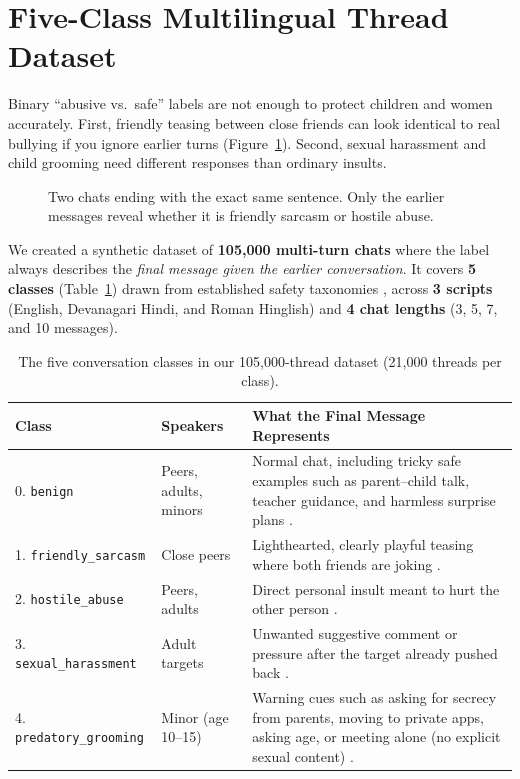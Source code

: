 \documentclass[11pt,a4paper]{article}
\begin{document}
\section{Five-Class Multilingual Thread Dataset}\label{sec:data}

Binary ``abusive vs.\ safe'' labels are not enough to protect children and women accurately. First, friendly teasing between close friends can look identical to real bullying if you ignore earlier turns (Figure~\ref{fig:chats}). Second, sexual harassment and child grooming need different responses than ordinary insults.

\begin{figure}[H]
  \centering
  \resizebox{0.82\textwidth}{!}{}
  \caption{Two chats ending with the exact same sentence. Only the earlier messages reveal whether it is friendly sarcasm or hostile abuse.}
  \label{fig:chats}
\end{figure}

We created a synthetic dataset of \textbf{105{,}000 multi-turn chats} where the label always describes the \textit{final message given the earlier conversation}. It covers \textbf{5 classes} (Table~\ref{tab:classes}) drawn from established safety taxonomies \cite{vanhee2018cyberbullying,guest2021misogyny,banko2020taxonomy,waseem2017understanding,mandl2019hasoc}, across \textbf{3 scripts} (English, Devanagari Hindi, and Roman Hinglish) and \textbf{4 chat lengths} (3, 5, 7, and 10 messages).

\begin{table}[H]
\centering
\caption{The five conversation classes in our 105{,}000-thread dataset (21{,}000 threads per class).}
\label{tab:classes}
\small
\begin{tabularx}{\textwidth}{l l X}
\toprule
\textbf{Class} & \textbf{Speakers} & \textbf{What the Final Message Represents} \\
\midrule
0. \texttt{benign} & Peers, adults, minors & Normal chat, including tricky safe examples such as parent--child talk, teacher guidance, and harmless surprise plans \cite{mandl2019hasoc}. \\
1. \texttt{friendly\_sarcasm} & Close peers & Lighthearted, clearly playful teasing where both friends are joking \cite{vanhee2018cyberbullying}. \\
2. \texttt{hostile\_abuse} & Peers, adults & Direct personal insult meant to hurt the other person \cite{waseem2017understanding,NEURIPS2022_a7c4163b}. \\
3. \texttt{sexual\_harassment} & Adult targets & Unwanted suggestive comment or pressure after the target already pushed back \cite{guest2021misogyny}. \\
4. \texttt{predatory\_grooming} & Minor (age 10--15) & Warning cues such as asking for secrecy from parents, moving to private apps, asking age, or meeting alone (no explicit sexual content) \cite{banko2020taxonomy}. \\
\bottomrule
\end{tabularx}
\end{table}
\end{document}
